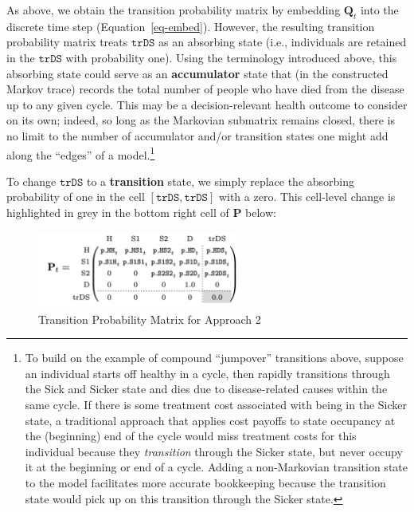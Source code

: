 \documentclass[
]{agujournal2019}
\begin{document}
As above, we obtain the transition probability matrix by embedding
\(\mathbf{Q}_t\) into the discrete time step (Equation~\ref{eq-embed}).
However, the resulting transition probability matrix treats
\(\texttt{trDS}\) as an absorbing state (i.e., individuals are retained
in the \(\texttt{trDS}\) with probability one). Using the terminology
introduced above, this absorbing state could serve as an
\textbf{accumulator} state that (in the constructed Markov trace)
records the total number of people who have died from the disease up to
any given cycle. This may be a decision-relevant health outcome to
consider on its own; indeed, so long as the Markovian submatrix remains
closed, there is no limit to the number of accumulator and/or transition
states one might add along the ``edges'' of a model.\footnote{To build
  on the example of compound ``jumpover'' transitions above, suppose an
  individual starts off healthy in a cycle, then rapidly transitions
  through the Sick and Sicker state and dies due to disease-related
  causes within the same cycle. If there is some treatment cost
  associated with being in the Sicker state, a traditional approach that
  applies cost payoffs to state occupancy at the (beginning) end of the
  cycle would miss treatment costs for this individual because they
  \emph{transition} through the Sicker state, but never occupy it at the
  beginning or end of a cycle. Adding a non-Markovian transition state
  to the model facilitates more accurate bookkeeping because the
  transition state would pick up on this transition through the Sicker
  state.}

To change \(\texttt{trDS}\) to a \textbf{transition} state, we simply
replace the absorbing probability of one in the cell
\([\texttt{trDS},\texttt{trDS}]\) with a zero. This cell-level change is
highlighted in grey in the bottom right cell of \(\mathbf{P}\) below:

\begin{figure}[H]

{\centering \includegraphics[width=0.6\textwidth,height=\textheight]{images/P_model1.png}

}

\caption{Transition Probability Matrix for Approach 2}

\end{figure}%
\end{document}
